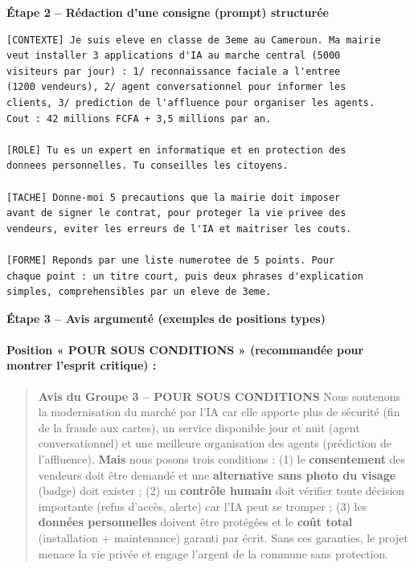 \documentclass[11pt]{article}
\begin{document}
\begin{exoresolu}
\textbf{Étape 2 -- Rédaction d'une consigne (prompt) structurée}

\begin{lstlisting}
[CONTEXTE] Je suis eleve en classe de 3eme au Cameroun. Ma mairie
veut installer 3 applications d'IA au marche central (5000
visiteurs par jour) : 1/ reconnaissance faciale a l'entree
(1200 vendeurs), 2/ agent conversationnel pour informer les
clients, 3/ prediction de l'affluence pour organiser les agents.
Cout : 42 millions FCFA + 3,5 millions par an.

[ROLE] Tu es un expert en informatique et en protection des
donnees personnelles. Tu conseilles les citoyens.

[TACHE] Donne-moi 5 precautions que la mairie doit imposer
avant de signer le contrat, pour proteger la vie privee des
vendeurs, eviter les erreurs de l'IA et maitriser les couts.

[FORME] Reponds par une liste numerotee de 5 points. Pour
chaque point : un titre court, puis deux phrases d'explication
simples, comprehensibles par un eleve de 3eme.
\end{lstlisting}

\textbf{Étape 3 -- Avis argumenté (exemples de positions types)}

\paragraph{Position « POUR SOUS CONDITIONS » (recommandée pour montrer l'esprit critique) :}
\begin{quote}
\textbf{Avis du Groupe 3 -- POUR SOUS CONDITIONS}
Nous soutenons la modernisation du marché par l'IA car elle apporte plus de sécurité (fin de la fraude aux cartes), un service disponible jour et nuit (agent conversationnel) et une meilleure organisation des agents (prédiction de l'affluence). \textbf{Mais} nous posons trois conditions : (1) le \textbf{consentement} des vendeurs doit être demandé et une \textbf{alternative sans photo du visage} (badge) doit exister ; (2) un \textbf{contrôle humain} doit vérifier toute décision importante (refus d'accès, alerte) car l'IA peut se tromper ; (3) les \textbf{données personnelles} doivent être protégées et le \textbf{coût total} (installation + maintenance) garanti par écrit. Sans ces garanties, le projet menace la vie privée et engage l'argent de la commune sans protection.
\end{quote}


\end{exoresolu}
\end{document}

